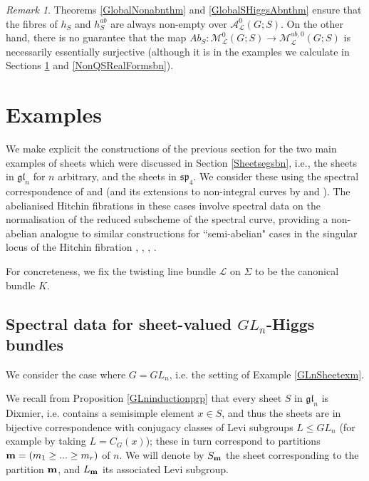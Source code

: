 \documentclass{amsart}
\theoremstyle{remark}
\newtheorem{remark}[theorem]{Remark}
\numberwithin{theorem}{section}
\numberwithin{equation}{section}
\begin{document}
\begin{remark}\label{AbSurjectivermk}
    Theorems \ref{GlobalNonabnthm} and \ref{GlobalSHiggsAbnthm} ensure that the fibres of $h_S$ and $h_S^{ab}$ are always non-empty over $\mathcal A_\mathcal L^0(G;S)$. On the other hand, there is no guarantee that the map $Ab_S:\mathcal M^0_\mathcal L(G;S) \rightarrow \mathcal M^{ab, 0}_\mathcal L(G;S)$ is necessarily essentially surjective (although it is in the examples we calculate in Sections \ref{Hitchinegscn} and \ref{NonQSRealFormsbn}).
\end{remark}

\section{Examples}\label{Hitchinegscn}
We make explicit the constructions of the previous section for the two main examples of sheets which were discussed in Section \ref{Sheetsegsbn}, i.e., the sheets in $\mathfrak{gl}_n$ for $n$ arbitrary, and the sheets in $\mathfrak{sp}_4$. We consider these using the spectral correspondence of \cite{Hitchin2} and \cite{BNR} (and its extensions to non-integral curves by \cite{Schaub} and \cite{Carbone}). The abelianised Hitchin fibrations in these cases involve spectral data on the normalisation of the reduced subscheme of the spectral curve, providing a non-abelian analogue to similar constructions for ``semi-abelian" cases in the singular locus of the Hitchin fibration \cite{Hitchin4}, \cite{Horn1}, \cite{Horn2}, \cite{FraPN}.

For concreteness, we fix the twisting line bundle $\mathcal L$ on $\Sigma$ to be the canonical bundle $K$.

\subsection{Spectral data for sheet-valued \texorpdfstring{$GL_n$}{GLn}-Higgs bundles}\label{GLnHitchinsbn}

We consider the case where $G = GL_n$, i.e. the setting of Example \ref{GLnSheetexm}. 

We recall from Proposition \ref{GLninductionprp} that every sheet $S$ in $\mathfrak{gl}_n$ is Dixmier, i.e. contains a semisimple element $x \in S$, and thus the sheets are in bijective correspondence with conjugacy classes of Levi subgroups $L \leq GL_n$ (for example by taking $L=C_G(x)$); these in turn correspond to partitions ${\bf m} = (m_1 \geq ...\geq m_r)$ of $n$. We will denote by $S_{\bf m}$ the sheet corresponding to the partition ${\bf m}$, and $L_{\bf m}$ its associated Levi subgroup.
\end{document}
